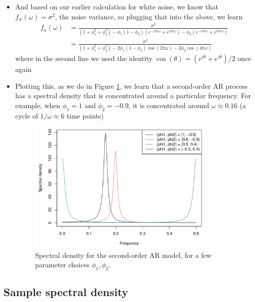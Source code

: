 \documentclass{article}
\begin{document}
\begin{itemize}
\item And based on our earlier calculation for white noise, we know that
  $f_w(\omega) = \sigma^2$, the noise variance, so plugging that into the above,
  we learn 
  \begin{align*}
  f_x(\omega) &= \frac{\sigma^2}{ (1+\phi_1^2+\phi_2^2)  
    - \phi_1(1-\phi_2) (e^{-2\pi i \omega} + e^{2\pi i \omega})
    - \phi_2 (e^{-4\pi i \omega} + e^{4\pi i \omega}) } \\
  &= \frac{\sigma^2}{ (1+\phi_1^2+\phi_2^2)  
    -2 \phi_1(1-\phi_2) \cos(2\pi \omega) 
    - 2 \phi_2 \cos(4\pi \omega) }
  \end{align*}
  where in the second line we used the identity $\cos(\theta) = (e^{i\theta}
  +e^{i\theta}) / 2$ once again

\item Plotting this, as we do in Figure \ref{fig:spectral_density_ar}, we learn
  that a second-order AR process has a spectral density that is concentrated
  around a particular frequency. For example, when $\phi_1 = 1$ and $\phi_2 = 
  -0.9$, it is concentrated around $\omega \approx 0.16$ (a cycle of $1/\omega
  \approx 6$ time points)

\begin{figure}[htb]
\centering
\includegraphics[width=0.85\textwidth]{fig/spectral-density-ar-1.pdf}
\caption{Spectral density for the second-order AR model, for a few parameter
  choices $\phi_1,\phi_2$.}
\label{fig:spectral_density_ar}
\end{figure}
\end{itemize}

\subsection{Sample spectral density}
\end{document}
